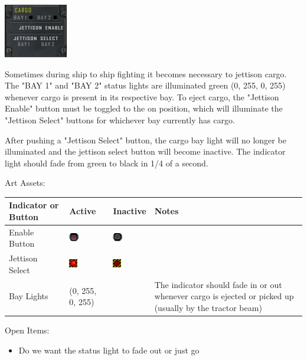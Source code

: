 \includegraphics[scale=0.7]{images/cargo.png}

Sometimes during ship to ship fighting it becomes necessary to jettison cargo.
The "BAY 1" and "BAY 2" status lights are illuminated green (0, 255, 0, 255)
whenever cargo is present in its respective bay.  To eject cargo, the
"Jettison Enable" button must be toggled to the on position, which will
illuminate the "Jettison Select" buttons for whichever bay currently
has cargo.

After pushing a "Jettison Select" button, the cargo bay light will no longer
be illuminated and the jettison select button will become inactive.  The
indicator light should fade from green to black in 1\slash 4 of a second.

Art Assets:

\begin{tabular}{ | l | l | l | p{3.5cm} | }
\hline
Indicator or Button & Active & Inactive & Notes \\
\hline
Enable Button & \includegraphics{images/button_red_on.png} & \includegraphics{images/button_red_off.png} & \\
Jettison Select & \includegraphics{images/button_danger_on.png} & \includegraphics{images/button_danger_off.png} & \\
Bay Lights & (0, 255, 0, 255) & & The indicator should fade in or out whenever
cargo is ejected or picked up (usually by the tractor beam) \\ 
\hline
\end{tabular}

Open Items:
\begin{itemize}
\item Do we want the status light to fade out or just go 
\end{itemize}

